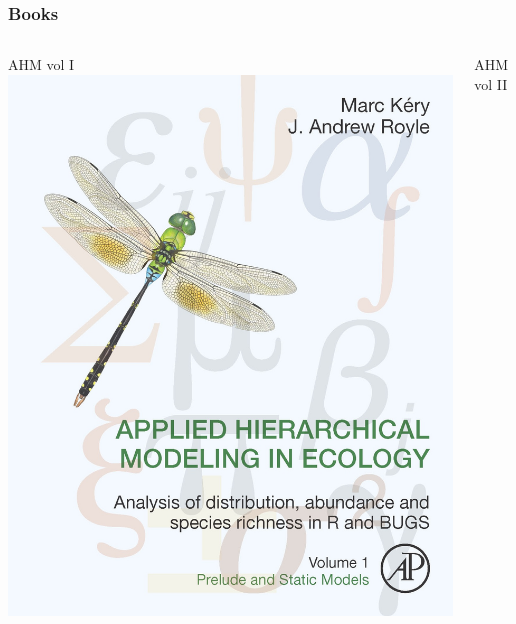 \documentclass[color=usenames,dvipsnames]{beamer}\usepackage[]{graphicx}\usepackage[]{xcolor}
\begin{document}
\begin{frame}
  \frametitle{Books}
  \begin{columns}
    \begin{column}{0.33\textwidth}
      \centering
      AHM vol I\\
      \includegraphics[width=\textwidth]{figs/KeryRoyleBookCover} \\
    \end{column}
    \begin{column}{0.33\textwidth}
      \centering
      AHM vol II\\

\end{column}
\end{columns}
\end{frame}
\end{document}
